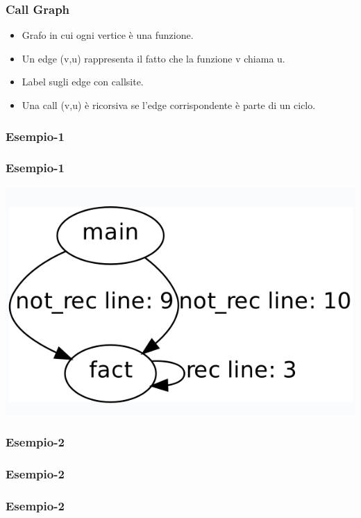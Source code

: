 \documentclass{beamer}
\begin{document}
\begin{frame}
\frametitle{Call Graph}
\begin{itemize}
\item Grafo in cui ogni vertice è una funzione.
\item Un edge (v,u) rappresenta il fatto che la funzione v chiama u.
\item Label sugli edge con callsite.
\item Una call (v,u) è ricorsiva se l'edge corrispondente è parte di un ciclo.
\end{itemize}
\end{frame}





\begin{frame}
\frametitle{Esempio-1}

\end{frame}

\begin{frame}
\frametitle{Esempio-1}
\includegraphics[scale=0.5]{graph3.png}
\end{frame}

\begin{frame}
\frametitle{Esempio-2}

\end{frame}

\begin{frame}
\frametitle{Esempio-2}

\end{frame}

\begin{frame}
\frametitle{Esempio-2}

\end{frame}
\end{document}
